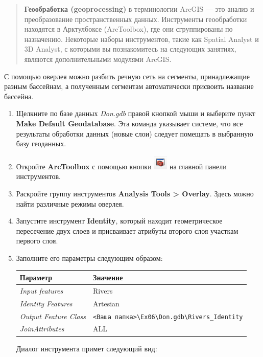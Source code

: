 \documentclass[]{book}
\theoremstyle{definition}
\theoremstyle{definition}
\theoremstyle{definition}
\theoremstyle{remark}
\begin{document}
\begin{quote}
\textbf{Геообработка (geoprocessing)} в терминологии ArcGIS --- это
анализ и преобразование пространственных данных. Инструменты
геообработки находятся в Арктулбоксе (ArcToolbox), где они сгруппированы
по назначению. Некоторые наборы инструментов, такие как Spatial Analyst
и 3D Analyst, с которыми вы познакомитесь на следующих занятиях,
являются дополнительными модулями ArcGIS.
\end{quote}

С помощью оверлея можно разбить речную сеть на сегменты, принадлежащие
разным бассейнам, а полученным сегментам автоматически присвоить
название бассейна.

\begin{enumerate}
\def\labelenumi{\arabic{enumi}.}
\item
  Щелкните по базе данных \emph{Don.gdb} правой кнопкой мыши и выберите
  пункт \textbf{Make Default Geodatabase}. Эта команда указывает
  системе, что все результаты обработки данных (новые слои) следует
  помещать в выбранную базу геоданных.
\item
  Откройте \textbf{ArcToolbox} с помощью кнопки
  \includegraphics{images/Ex06/image19.png} на главной панели
  инструментов.
\item
  Раскройте группу инструментов \textbf{Analysis Tools \textgreater{}
  Overlay}. Здесь можно найти различные режимы оверлея.
\item
  Запустите инструмент \textbf{Identity}, который находит геометрическое
  пересечение двух слоев и присваивает атрибуты второго слоя участкам
  первого слоя.
\item
  Заполните его параметры следующим образом:

  \begin{longtable}[]{@{}ll@{}}
  \toprule
  Параметр & Значение\tabularnewline
  \midrule
  \endhead
  \emph{Input features} & Rivers\tabularnewline
  \emph{Identity Features} & Artesian\tabularnewline
  \emph{Output Feature Class} &
  \texttt{\textless{}Ваша\ папка\textgreater{}\textbackslash{}Ex06\textbackslash{}Don.gdb\textbackslash{}Rivers\_Identity}\tabularnewline
  \emph{JoinAttributes} & ALL\tabularnewline
  \bottomrule
  \end{longtable}

  Диалог инструмента примет следующий вид:


\end{enumerate}
\end{document}
